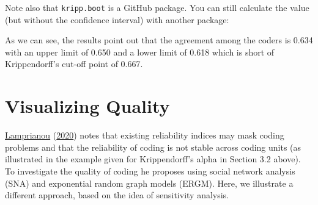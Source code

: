 \documentclass[
]{book}
\newenvironment{Shaded}{\begin{snugshade}}{\end{snugshade}}
\newcommand{\AttributeTok}[1]{\textcolor[rgb]{0.77,0.63,0.00}{#1}}
\newcommand{\DecValTok}[1]{\textcolor[rgb]{0.00,0.00,0.81}{#1}}
\newcommand{\FunctionTok}[1]{\textcolor[rgb]{0.00,0.00,0.00}{#1}}
\newcommand{\NormalTok}[1]{#1}
\newcommand{\OtherTok}[1]{\textcolor[rgb]{0.56,0.35,0.01}{#1}}
\newcommand{\SpecialCharTok}[1]{\textcolor[rgb]{0.00,0.00,0.00}{#1}}
\newcommand{\StringTok}[1]{\textcolor[rgb]{0.31,0.60,0.02}{#1}}
\begin{document}
\begin{Shaded}
\end{Shaded}

Note also that \texttt{kripp.boot} is a GitHub package. You can still calculate the value (but without the confidence interval) with another package:

\begin{Shaded}
\end{Shaded}

As we can see, the results point out that the agreement among the coders is 0.634 with an upper limit of 0.650 and a lower limit of 0.618 which is short of Krippendorff's cut-off point of 0.667.

\hypertarget{visualizing-quality}{%
\section{Visualizing Quality}\label{visualizing-quality}}

\protect\hyperlink{ref-Lamprianou2020}{Lamprianou} (\protect\hyperlink{ref-Lamprianou2020}{2020}) notes that existing reliability indices may mask coding problems and that the reliability of coding is not stable across coding units (as illustrated in the example given for Krippendorff's alpha in Section 3.2 above). To investigate the quality of coding he proposes using social network analysis (SNA) and exponential random graph models (ERGM). Here, we illustrate a different approach, based on the idea of sensitivity analysis.
\end{document}
